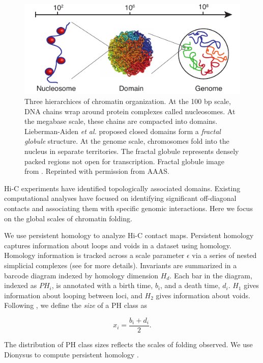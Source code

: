 \begin{figure}
       \centering
       \includegraphics[width=\columnwidth]{./fig/chromatin_cartoon.pdf}
       \caption{Three hierarchices of chromatin organization. At the 100 bp scale, DNA chains wrap around protein complexes called nucleosomes. At the megabase scale, these chains are compacted into domains. Lieberman-Aiden \emph{et al.} proposed closed domains form a \emph{fractal globule} structure. At the genome scale, chromosomes fold into the nucleus in separate territories. The fractal globule represents densely packed regions not open for transcription. Fractal globule image from \cite{LiebermanAiden:2009jz}. Reprinted with permission from AAAS.}
       \label{fig:chromatin_cartoon}
\end{figure}

Hi-C experiments have identified topologically associated domains.
Existing computational analyses have focused on identifying significant off-diagonal contacts and associating them with specific genomic interactions.
Here we focus on the global scales of chromatin folding.

We use persistent homology to analyze Hi-C contact maps.
Persistent homology captures information about loops and voids in a dataset using homology.
Homology information is tracked across a scale parameter $\epsilon$ via a series of nested simplicial complexes (see \cite{Carlsson:2014cn} for more details).
Invariants are summarized in a barcode diagram indexed by homology dimension $H_d$.
Each bar in the diagram, indexed as $PH_{i}$, is annotated with a birth time, $b_i$, and a death time, $d_i$.
$H_1$ gives information about looping between loci, and $H_2$ gives information about voids.
Following \cite{MacPherson:2012eq}, we define the \emph{size} of a PH class as

\begin{equation}
x_i = \frac{b_i+d_i}{2}.
\end{equation}

The distribution of PH class sizes reflects the scales of folding observed.
We use Dionysus to compute persistent homology \cite{Morozov:2012}.

